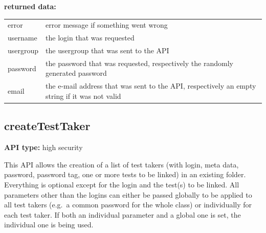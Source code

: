 \documentclass[12pt]{article} %
\newenvironment{keyword}{\leavevmode\color{magenta}}{}
\newenvironment{properties}
{
    \footnotesize\renewcommand{\arraystretch}{1.30}
    \renewcommand{\tabcolsep}{0pt}
    \begin{longtable}{>{\begin{keyword}}p{3.1cm}<{\end{keyword}}p{13.9cm}}
        \hline
        }
        {
        \hline
    \end{longtable}\vspace{5mm}
}
\begin{document}
    \begin{minipage}{\textwidth}
        \textbf{returned data:}
        \begin{properties}
            error     & error message if something went wrong                                         \\
            username  & the login that was requested                                                  \\
            usergroup & the usergroup that was sent to the API                                        \\
            password  & the password that was requested, respectively the randomly generated password \\
            email     & the e-mail address that was sent to the API, respectively an empty string if it was not valid \\
        \end{properties}
    \end{minipage}

    \subsection{createTestTaker}\label{subsec:createtesttaker}

    \textbf{API type:} high security

    This API allows the creation of a list of test takers (with login, meta data, password, password tag, one or more tests to be linked) in an existing folder.
    Everything is optional except for the login and the test(s) to be linked.
    All parameters other than the logins can either be passed globally to be applied to all test takers (e.g.\ a common password for the whole class) or individually for each test taker.
    If both an individual parameter and a global one is set, the individual one is being used.
\end{document}
